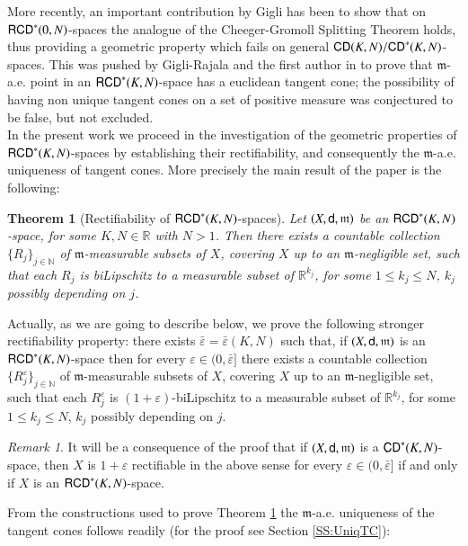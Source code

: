 \documentclass[11pt,reqno]{amsart}
\newcommand{\mm}{\mathfrak m}
\newcommand{\sfd}{{\sf d}}
\newcommand{\R}{\mathbb{R}}
\newcommand{\N}{\mathbb{N}}
\newcommand{\CD}{{\sf CD}}
\newcommand{\RCD}{{\sf RCD}}
\newcommand{\vare}{\varepsilon}
\newtheorem{theorem}{Theorem}[section]
\theoremstyle{definition}
\theoremstyle{remark}
\newtheorem{remark}{Remark}[section]
\theoremstyle{remark}
\theoremstyle{remark}
\theoremstyle{remark}
\theoremstyle{remark}
\theoremstyle{remark}
\theoremstyle{remark}
\begin{document}
More recently, an important contribution by Gigli \cite{GigliSplitting} has been to show that on $\RCD^*(0,N)$-spaces the analogue of the Cheeger-Gromoll Splitting Theorem \cite{ChGr} holds, thus providing a geometric property which fails on general $\CD(K,N)/\CD^*(K,N)$-spaces.  This was pushed by Gigli-Rajala and the first author in \cite{GMR2013} to prove that $\mm$-a.e. point in an $\RCD^*(K,N)$-space has a euclidean tangent cone; the possibility of having non unique tangent cones on a set of positive measure was conjectured to be false, but not excluded.
\\

In the present work we proceed in the investigation of the geometric properties of $\RCD^*(K,N)$-spaces by establishing their rectifiability, and consequently the $\mm$-a.e. uniqueness of tangent cones. More precisely the main result of the paper is the following:

\begin{theorem}[Rectifiability of $\RCD^*(K,N)$-spaces]\label{thm:rect}
Let $(X,\sfd, \mm)$ be an $\RCD^*(K,N)$-space, for some $K,N\in \R$ with $N> 1$. Then there exists a countable collection $\{R_j\}_{j \in \N}$ of $\mm$-measurable subsets of $X$, covering $X$ up to an $\mm$-negligible set, such that  each $R_j$ is biLipschitz to a measurable subset of $\R^{k_j}$, for some $1\leq k_j \leq N$, $k_j$ possibly depending on $j$.  
\end{theorem}
Actually, as we are going to describe below, we prove the following stronger rectifiability property: there exists $\bar{\vare}=\bar{\vare}(K,N)$ such that, if $(X,\sfd,\mm)$ is an $\RCD^*(K,N)$-space then for every $\vare\in (0, \bar \vare]$ there exists a countable collection $\{R^\vare_j\}_{j \in \N}$ of $\mm$-measurable subsets of $X$, covering $X$ up to an $\mm$-negligible set, such that  each $R_j^\vare$ is $(1+\vare)$-biLipschitz to a measurable subset of $\R^{k_j}$, for some $1\leq k_j \leq N$, $k_j$ possibly depending on $j$.


\begin{remark}
It will be a consequence of the proof that if $(X,\sfd, \mm)$ is a $\CD^*(K,N)$-space, then $X$ is $1+\vare$ rectifiable in the above sense for every $\vare \in (0,\bar{\vare}]$ if and only if $X$ is an $\RCD^*(K,N)$-space.
\end{remark}

 
From the constructions used to prove Theorem \ref{thm:rect} the $\mm$-a.e. uniqueness of the tangent cones follows  readily  (for the proof see  Section  \ref{SS:UniqTC}):
\end{document}
